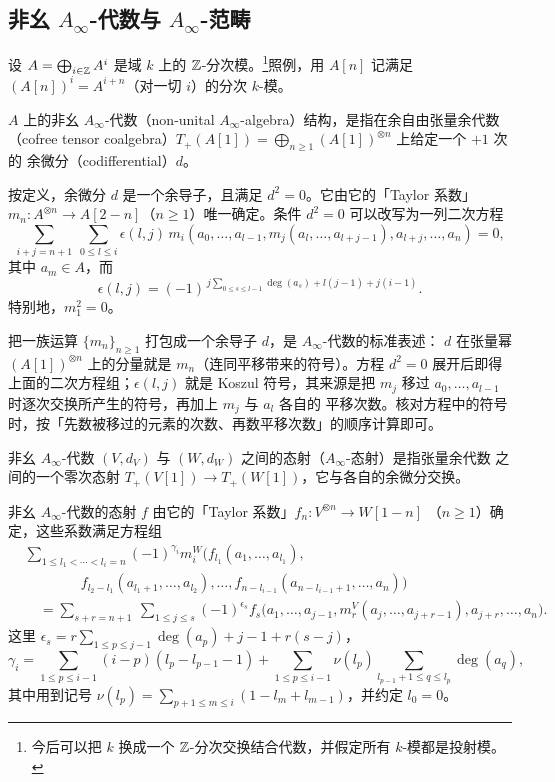 \subsection{非幺 $A_\infty$-代数与 $A_\infty$-范畴}

设 $A=\bigoplus_{i\in\mathbb{Z}}A^i$ 是域 $k$ 上的 $\mathbb{Z}$-分次模。\footnote{今后可以把 $k$ 换成一个
$\mathbb{Z}$-分次交换结合代数，并假定所有 $k$-模都是投射模。}照例，用 $A[n]$ 记满足
$(A[n])^i=A^{i+n}$（对一切 $i$）的分次 $k$-模。

\begin{dfn}
$A$ 上的非幺 $A_\infty$-代数（non-unital $A_\infty$-algebra）结构，是指在余自由张量余代数
（cofree tensor coalgebra）$T_+(A[1])=\bigoplus_{n\ge1}(A[1])^{\otimes n}$ 上给定一个 $+1$ 次的
余微分（codifferential）$d$。
\end{dfn}

按定义，余微分 $d$ 是一个余导子，且满足 $d^2=0$。它由它的「Taylor 系数」
$m_n\colon A^{\otimes n}\to A[2-n]$（$n\ge1$）唯一确定。条件 $d^2=0$ 可以改写为一列二次方程
\[
\sum_{i+j=n+1}\ \sum_{0\le l\le i}\epsilon(l,j)\,
m_i(a_0,\dots,a_{l-1},m_j(a_l,\dots,a_{l+j-1}),a_{l+j},\dots,a_n)=0,
\]
其中 $a_m\in A$，而
\[
\epsilon(l,j)=(-1)^{\,j\sum_{0\le s\le l-1}\deg(a_s)+l(j-1)+j(i-1)}.
\]
特别地，$m_1^2=0$。

\begin{yizhu}
把一族运算 $\{m_n\}_{n\ge1}$ 打包成一个余导子 $d$，是 $A_\infty$-代数的标准表述：
$d$ 在张量幂 $(A[1])^{\otimes n}$ 上的分量就是 $m_n$（连同平移带来的符号）。方程
$d^2=0$ 展开后即得上面的二次方程组；$\epsilon(l,j)$ 就是 Koszul 符号，其来源是把
$m_j$ 移过 $a_0,\dots,a_{l-1}$ 时逐次交换所产生的符号，再加上 $m_j$ 与 $a_l$ 各自的
平移次数。核对方程中的符号时，按「先数被移过的元素的次数、再数平移次数」的顺序计算即可。
\end{yizhu}

\begin{dfn}
非幺 $A_\infty$-代数 $(V,d_V)$ 与 $(W,d_W)$ 之间的态射（$A_\infty$-态射）是指张量余代数
之间的一个零次态射 $T_+(V[1])\to T_+(W[1])$，它与各自的余微分交换。
\end{dfn}

非幺 $A_\infty$-代数的态射 $f$ 由它的「Taylor 系数」$f_n\colon V^{\otimes n}\to W[1-n]$
（$n\ge1$）确定，这些系数满足方程组
\[
\begin{aligned}
&\sum_{1\le l_1<\cdots<l_i=n}(-1)^{\gamma_i}m_i^W\bigl(f_{l_1}(a_1,\dots,a_{l_1}),\\
&\qquad\qquad f_{l_2-l_1}(a_{l_1+1},\dots,a_{l_2}),\dots,
 f_{n-l_{i-1}}(a_{n-l_{i-1}+1},\dots,a_n)\bigr)\\
&\quad=\sum_{s+r=n+1}\ \sum_{1\le j\le s}(-1)^{\epsilon_s}
f_s\bigl(a_1,\dots,a_{j-1},m_r^V(a_j,\dots,a_{j+r-1}),a_{j+r},\dots,a_n\bigr).
\end{aligned}
\]
这里
$\epsilon_s=r\sum_{1\le p\le j-1}\deg(a_p)+j-1+r(s-j)$，
\[
\gamma_i=\sum_{1\le p\le i-1}(i-p)(l_p-l_{p-1}-1)
+\sum_{1\le p\le i-1}\nu(l_p)\sum_{l_{p-1}+1\le q\le l_p}\deg(a_q),
\]
其中用到记号 $\nu(l_p)=\sum_{p+1\le m\le i}(1-l_m+l_{m-1})$，并约定 $l_0=0$。

